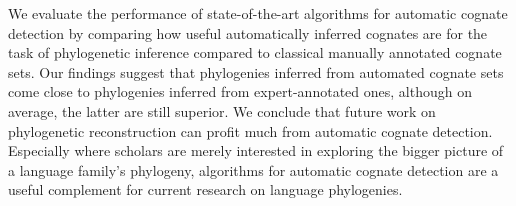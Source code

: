We evaluate the performance of state-of-the-art algorithms for automatic cognate detection by comparing how useful automatically inferred cognates are for the task of phylogenetic inference compared to classical manually annotated cognate sets. Our findings suggest that phylogenies inferred from automated cognate sets come close to phylogenies inferred from expert-annotated ones, although on average, the latter are still superior. We conclude that future work on phylogenetic reconstruction can profit much from automatic cognate detection. Especially where scholars are merely interested in exploring the bigger picture of a language family's phylogeny, algorithms for automatic cognate detection are a useful complement for current research on language phylogenies.
